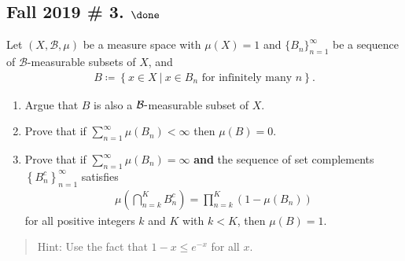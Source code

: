 \hypertarget{fall-2019-3.-done}{%
\subsection{\texorpdfstring{Fall 2019 \# 3.
\(\done\)}{Fall 2019 \# 3. \textbackslash done}}\label{fall-2019-3.-done}}

Let \((X, \mathcal B, \mu)\) be a measure space with \(\mu(X) = 1\) and
\(\{B_n\}_{n=1}^\infty\) be a sequence of \(\mathcal B\)-measurable
subsets of \(X\), and
\begin{align*}
B \coloneqq\left\{{x\in X {~\mathrel{\Big|}~}x\in B_n \text{ for infinitely many } n}\right\}.
\end{align*}

\begin{enumerate}
\def\labelenumi{\alph{enumi}.}
\item
  Argue that \(B\) is also a \(\mathcal{B} {\hbox{-}}\)measurable subset
  of \(X\).
\item
  Prove that if \(\sum_{n=1}^\infty \mu(B_n) < \infty\) then
  \(\mu(B)= 0\).
\item
  Prove that if \(\sum_{n=1}^\infty \mu(B_n) = \infty\) \textbf{and} the
  sequence of set complements \(\left\{{B_n^c}\right\}_{n=1}^\infty\)
  satisfies
  \begin{align*}
  \mu\left(\bigcap_{n=k}^{K} B_{n}^{c}\right)=\prod_{n=k}^{K}\left(1-\mu\left(B_{n}\right)\right)
  \end{align*}
  for all positive integers \(k\) and \(K\) with \(k < K\), then
  \(\mu(B) = 1\).
\end{enumerate}

\begin{quote}
Hint: Use the fact that \(1 - x ≤ e^{-x}\) for all \(x\).
\end{quote}

